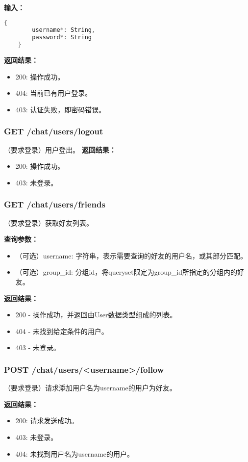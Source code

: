 \textbf{输入：}
\begin{lstlisting}[language=C]
    {
        username*: String,
        password*: String
    }
\end{lstlisting}

\textbf{返回结果：}
\begin{itemize}
    \item 200: 操作成功。
    \item 404: 当前已有用户登录。
    \item 403: 认证失败，即密码错误。
\end{itemize}

\subsubsection{\textbf{GET} /chat/users/logout}
（要求登录）用户登出。
\textbf{返回结果：}
\begin{itemize}
    \item 200: 操作成功。
    \item 403: 未登录。
\end{itemize}

\subsubsection{\textbf{GET} /chat/users/friends}
（要求登录）获取好友列表。

\textbf{查询参数：}
\begin{itemize}
    \item （可选）username: 字符串，表示需要查询的好友的用户名，或其部分匹配。
    \item （可选）group\_id: 分组id，将queryset限定为group\_id所指定的分组内的好友。
\end{itemize}

\textbf{返回结果：}
\begin{itemize}
    \item 200 - 操作成功，并返回由User数据类型组成的列表。
    \item 404 - 未找到给定条件的用户。
    \item 403 - 未登录。
\end{itemize}
    

\subsubsection{\textbf{POST} /chat/users/<username>/follow}
（要求登录）请求添加用户名为username的用户为好友。

\textbf{返回结果：}
\begin{itemize}
    \item 200: 请求发送成功。
    \item 403: 未登录。
    \item 404: 未找到用户名为username的用户。
\end{itemize}

